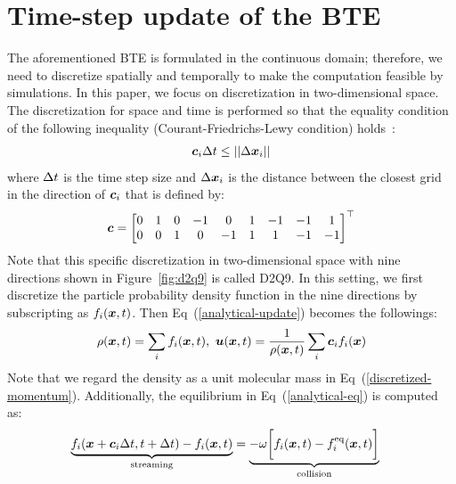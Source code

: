 \section{Time-step update of the BTE}
The aforementioned BTE is formulated in the 
continuous domain; therefore,
we need to discretize spatially and 
temporally to make the computation 
feasible by simulations.
In this paper, we focus on discretization
in two-dimensional space.
The discretization for space and time
is performed so that the equality condition of 
the following inequality
(Courant-Friedrichs-Lewy condition) holds~\cite{peyretcomputational, sterling1996stability}:
\begin{equation}
\begin{aligned}
  \boldsymbol{c}_i \Delta t \leq || \Delta \boldsymbol{x}_i ||
\end{aligned}
\end{equation}
where $\Delta t$ is the time step size 
and $\Delta \boldsymbol{x}_i$ is the distance between 
the closest grid in the direction
of $\boldsymbol{c}_i$ that is defined by:
\begin{equation}
\begin{aligned}
  \boldsymbol{c} = \begin{bmatrix}
    0 & 1 & 0 & -1 & 0 & 1 & -1 & -1 & 1 \\
    0 & 0 & 1 & 0 & -1 & 1 & 1 & -1 & -1 \\
  \end{bmatrix}^\top
\end{aligned}
\label{d2q9-velocity}
\end{equation}
Note that this specific discretization in two-dimensional
space with nine directions shown in 
Figure~\ref{fig:d2q9} is called D2Q9.
In this setting, 
we first discretize
the particle probability density function
in the nine directions by subscripting 
as $f_i(\boldsymbol{x}, t)$.
Then Eq~(\ref{analytical-update}) becomes the followings:
\begin{equation}
  \begin{aligned}
    \rho(\boldsymbol{x}, t) = \sum_i f_i(\boldsymbol{x}, t),~
    \boldsymbol{u}(\boldsymbol{x}, t) = 
    \frac{1}{\rho(\boldsymbol{x}, t)} \sum_i \boldsymbol{c}_i f_i(\boldsymbol{x}) \\
  \end{aligned}
  \label{discretized-density}
\end{equation}
Note that we regard the density as
a unit molecular mass in Eq~(\ref{discretized-momentum}).
Additionally, the equilibrium in Eq~(\ref{analytical-eq}) is computed as:
\begin{equation}
\begin{aligned}
  \underbrace{f_i(\boldsymbol{x} + \boldsymbol{c}_i\Delta t , t + \Delta t) - f_i(\boldsymbol{x}, t)}_{
    \text{streaming}
  } &= 
  \underbrace{- \omega 
  \biggl[
    f_i(\boldsymbol{x}, t) -
    f^{\rm eq}_i(\boldsymbol{x}, t)
  \biggl]}_{
    \text{collision}
  }
\end{aligned}
\label{discretized-streaming}
\end{equation}
